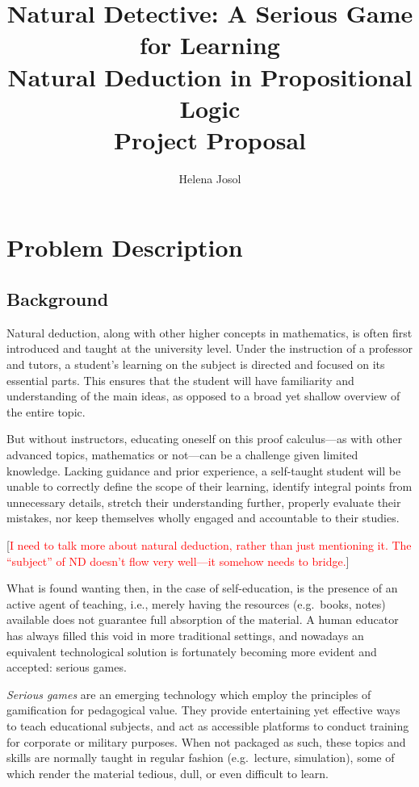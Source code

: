 \documentclass[a4paper]{article}
\title{Natural Detective: A Serious Game for Learning \\ Natural Deduction in Propositional Logic \\
  \medskip \Large{Project Proposal}}
\author{Helena Josol}
\date{}
\newcommand{\comment}[1]{[\textcolor{red}{#1}]} %
\begin{document}
\maketitle


\section{Problem Description}

\subsection{Background}
Natural deduction, along with other higher concepts in mathematics, is often first introduced and taught at the university level. Under the instruction of a professor and tutors, a student's learning on the subject is directed and focused on its essential parts. This ensures that the student will have familiarity and understanding of the main ideas, as opposed to a broad yet shallow overview of the entire topic.

But without instructors, educating oneself on this proof calculus---as with other advanced topics, mathematics or not---can be a challenge given limited knowledge. Lacking guidance and prior experience, a self-taught student will be unable to correctly define the scope of their learning, identify integral points from unnecessary details, stretch their understanding further, properly evaluate their mistakes, nor keep themselves wholly engaged and accountable to their studies.

\comment{I need to talk more about natural deduction, rather than just mentioning it. The ``subject'' of ND doesn't flow very well---it somehow needs to bridge.}

What is found wanting then, in the case of self-education, is the presence of an active agent of teaching, i.e., merely having the resources (e.g.\ books, notes) available does not guarantee full absorption of the material. A human educator has always filled this void in more traditional settings, and nowadays an equivalent technological solution is fortunately becoming more evident and accepted: serious games.

\emph{Serious games} are an emerging technology which employ the principles of gamification for pedagogical value. They provide entertaining yet effective ways to teach educational subjects, and act as accessible platforms to conduct training for corporate or military purposes. When not packaged as such, these topics and skills are normally taught in regular fashion (e.g.\ lecture, simulation), some of which render the material tedious, dull, or even difficult to learn.
\end{document}
